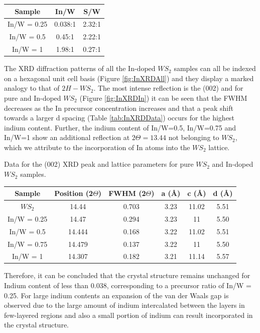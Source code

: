 \begin{center}
\begin{tabular}{c|cc}

Sample 		& In/W 		& S/W\\\hline
In/W = 0.25 & 0.038:1 	& 2.32:1\\
In/W = 0.5	& 0.45:1	& 2.22:1\\
In/W = 1	& 1.98:1	& 0.27:1

\end{tabular}
\end{center}

The XRD diffraction patterns of all the In-doped $WS_2$ samples can all be indexed on a hexagonal unit cell basis (Figure \ref{fig:InXRDAll}) and they display a marked analogy to that of $2H-WS_2$. The most intense reflection is the (002) and for pure and In-doped $WS_2$ (Figure \ref{fig:InXRDIn}) it can be seen that the FWHM decreases as the In precursor concentration increases and that a peak shift towards a larger d spacing (Table \ref{tab:InXRDData}) occurs for the highest indium content. Further, the indium content of In/W=0.5, In/W=0.75 and In/W=1 show an additional reflection at $2{\Theta}=13.44$ not belonging to $WS_2$, which we attribute to the incorporation of In atoms into the $WS_2$ lattice.

\begin{table}[!ht]
\caption{Data for the (002) XRD peak and lattice parameters for pure $WS_2$ and In-doped $WS_2$ samples.}
\label{tab:InXRDData}
\end{table}

\begin{center}
\begin{tabular}{c|ccccc}

Sample 		& Position (2$\Theta$)	& FWHM (2$\Theta$)	& a (\r{A})	& c (\r{A})	& d (\r{A})	\\\hline
$WS_2$	 	& 14.44 				& 0.703				& 3.23		& 11.02		& 5.51		\\
In/W = 0.25	& 14.47					& 0.294				& 3.23		& 11		& 5.50		\\
In/W = 0.5	& 14.444				& 0.168				& 3.22		& 11.02		& 5.51		\\
In/W = 0.75	& 14.479				& 0.137				& 3.22		& 11		& 5.50		\\
In/W = 1	& 14.307				& 0.182				& 3.21		& 11.14		& 5.57

\end{tabular}
\end{center}

Therefore, it can be concluded that the crystal structure remains unchanged for Indium content of less than 0.038, corresponding to a precursor ratio of In/W = 0.25. For large indium contents an expansion of the van der Waals gap is observed due to the large amount of indium intercalated between the layers in few-layered regions and also a small portion of indium can result incorporated in the crystal structure. 

